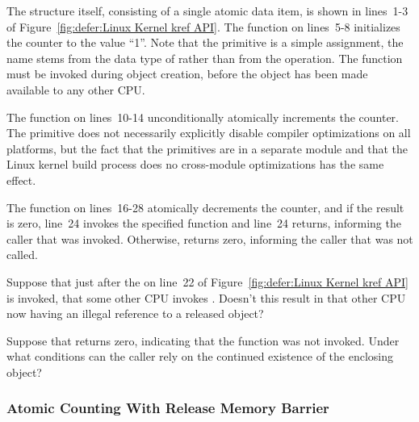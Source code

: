 The  structure itself, consisting of a single atomic
data item, is shown in lines~1-3 of
Figure~\ref{fig:defer:Linux Kernel kref API}.
The  function on lines~5-8 initializes the counter
to the value ``1''.
Note that the  primitive is a simple
assignment, the name stems from the data type of 
rather than from the operation.
The  function must be invoked during object creation,
before the object has been made available to any other CPU.

The  function on lines~10-14 unconditionally atomically
increments the counter.
The  primitive does not necessarily explicitly
disable compiler
optimizations on all platforms, but the fact that the 
primitives are in a separate module and that the Linux kernel build
process does no cross-module optimizations has the same effect.

The  function on lines~16-28 atomically decrements the
counter, and if the result is zero, line~24 invokes the specified
 function and line~24 returns, informing the caller
that  was invoked.
Otherwise,  returns zero, informing the caller that
 was not called.

\QuickQuiz{}
	Suppose that just after the 
	on line~22 of
	Figure~\ref{fig:defer:Linux Kernel kref API} is invoked,
	that some other CPU invokes .
	Doesn't this result in that other CPU now having an illegal
	reference to a released object?
 \QuickQuizEnd

\QuickQuiz{}
	Suppose that  returns zero, indicating that
	the  function was not invoked.
	Under what conditions can the caller rely on the continued
	existence of the enclosing object?
 \QuickQuizEnd

\subsubsection{Atomic Counting With Release Memory Barrier}
\label{sec:defer:Atomic Counting With Release Memory Barrier}

